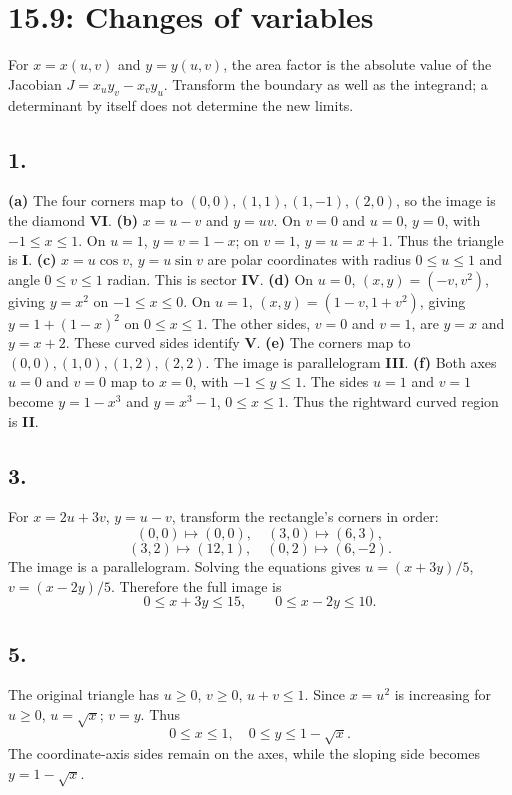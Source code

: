 \documentclass[11pt]{article}
\newcommand{\ex}[1]{\subsection*{#1.}}
\newcommand{\ans}[1]{\boxed{#1}}
\begin{document}
\clearpage\section*{15.9: Changes of variables}
For $x=x(u,v)$ and $y=y(u,v)$, the area factor is the absolute value of the Jacobian $J=x_uy_v-x_vy_u$. Transform the boundary as well as the integrand; a determinant by itself does not determine the new limits.
\ex{1}
\textbf{(a)} The four corners map to $(0,0),(1,1),(1,-1),(2,0)$, so the image is the diamond \textbf{VI}.
\textbf{(b)} $x=u-v$ and $y=uv$. On $v=0$ and $u=0$, $y=0$, with $-1\le x\le1$. On $u=1$, $y=v=1-x$; on $v=1$, $y=u=x+1$. Thus the triangle is \textbf{I}.
\textbf{(c)} $x=u\cos v$, $y=u\sin v$ are polar coordinates with radius $0\le u\le1$ and angle $0\le v\le1$ radian. This is sector \textbf{IV}.
\textbf{(d)} On $u=0$, $(x,y)=(-v,v^2)$, giving $y=x^2$ on $-1\le x\le0$. On $u=1$, $(x,y)=(1-v,1+v^2)$, giving $y=1+(1-x)^2$ on $0\le x\le1$. The other sides, $v=0$ and $v=1$, are $y=x$ and $y=x+2$. These curved sides identify \textbf{V}.
\textbf{(e)} The corners map to $(0,0),(1,0),(1,2),(2,2)$. The image is parallelogram \textbf{III}.
\textbf{(f)} Both axes $u=0$ and $v=0$ map to $x=0$, with $-1\le y\le1$. The sides $u=1$ and $v=1$ become $y=1-x^3$ and $y=x^3-1$, $0\le x\le1$. Thus the rightward curved region is \textbf{II}.
\ex{3}
For $x=2u+3v$, $y=u-v$, transform the rectangle's corners in order:
\[(0,0)\mapsto(0,0),\quad(3,0)\mapsto(6,3),\]
\[(3,2)\mapsto(12,1),\quad(0,2)\mapsto(6,-2).\]
The image is a parallelogram.
Solving the equations gives $u=(x+3y)/5$, $v=(x-2y)/5$. Therefore the full image is
\[\ans{0\le x+3y\le15,\qquad0\le x-2y\le10}.\]
\begin{center}\end{center}
\ex{5}
The original triangle has $u\ge0$, $v\ge0$, $u+v\le1$. Since $x=u^2$ is increasing for $u\ge0$, $u=\sqrt x$; $v=y$. Thus
\[\ans{0\le x\le1,\quad0\le y\le1-\sqrt x}.\]
The coordinate-axis sides remain on the axes, while the sloping side becomes $y=1-\sqrt x$.
\begin{center}\end{center}
\end{document}

